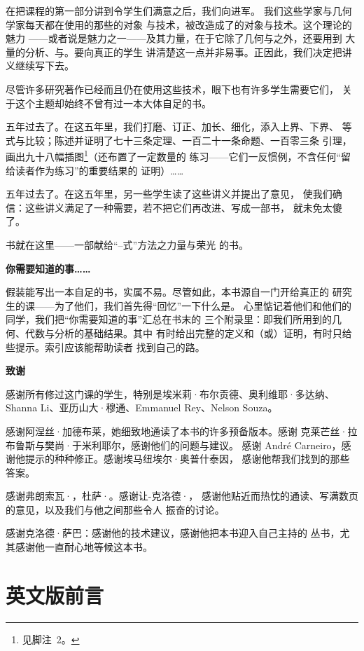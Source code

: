 在把课程的第一部分讲到令学生们满意之后，我们向\trFloerHomology{}进军。
我们这些\trTopology{}学家与几何学家每天都在使用的那些\trMorseHomology{}的对象
与技术，被改造成了\trFloerHomology{}的对象与技术。这个理论的魅力
——或者说是魅力之一——及其力量，在于它除了几何与\trTopology{}之外，还要用到
大量的分析、\trFredholmOperator{}与\trSobolevSpace{}。要向真正的学生
讲清楚这一点并非易事。正因此，我们决定把讲义继续写下去。

尽管许多研究著作已经而且仍在使用这些技术，眼下也有许多学生需要它们，
关于这个主题却始终不曾有过一本大体自足的书。

五年过去了。在这五年里，我们打磨、订正、加长、细化，添入上界、下界、
等式与比较；陈述并证明了七十三条定理、一百二十一条命题、一百零三条
引理，画出九十八幅插图\footnote{见脚注~2。}（还布置了一定数量的
练习——它们一反惯例，不含任何“留给读者作为练习”的重要结果的
证明）……

五年过去了。在这五年里，另一些学生读了这些讲义并提出了意见，
使我们确信：这些讲义满足了一种需要，若不把它们再改进、写成一部书，
就未免太傻了。

书就在这里——一部献给“\trMorse--\trFloer{}式”\trHomology{}方法之力量与荣光
的书。

\noindent\textbf{你需要知道的事……}

假装能写出一本自足的书，实属不易。尽管如此，本书源自一门开给真正的
研究生的课——为了他们，我们首先得“回忆”一下什么是\trManifold{}。
心里惦记着他们和他们的同学，我们把“你需要知道的事”汇总在书末的
三个附录里：即我们所用到的\trDifferential{}几何、代数\trTopology{}与分析的基础结果。其中
有时给出完整的定义和（或）证明，有时只给些提示。索引应该能帮助读者
找到自己的路。

\noindent\textbf{致谢}

感谢所有修过这门课的学生，特别是埃米莉·布尔贡德、奥利维耶·多达纳、Shanna Li、亚历山大·穆通、Emmanuel Rey、Nelson Souza。

感谢阿涅丝·加德布莱，她细致地通读了本书的许多预备版本。感谢
克莱芒丝·拉布鲁斯与樊尚·于米利耶尔，感谢他们的问题与建议。
感谢 Andr\'e Carneiro，感谢他提示的种种修正。感谢埃马纽埃尔·奥普什泰因，
感谢他帮我们找到的那些答案。

感谢弗朗索瓦·\trLaudenbach，杜萨·\trMcDuff。感谢让-克洛德·\trSikorav，
感谢他贴近而热忱的通读、写满数页的意见，以及我们与他之间那些令人
振奋的讨论。

感谢克洛德·萨巴：感谢他的技术建议，感谢他把本书迎入自己主持的
丛书，尤其感谢他一直耐心地等候这本书。

\section*{英文版前言}

